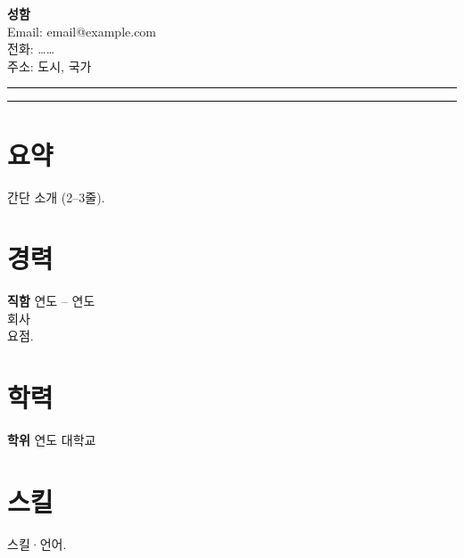 \documentclass[11pt,a4paper]{article}
\begin{document}
\begin{minipage}[t]{0.72\textwidth}
\vspace{0pt}
{\LARGE \textbf{성함}}\\[0.25em]
Email: email@example.com \\
전화: …… \\
주소: 도시, 국가
\end{minipage}
\begin{minipage}[t]{0.25\textwidth}
\vspace{0pt}
\raggedleft
\rule{2.8cm}{3.2cm}
\end{minipage}
\vspace{0.5em}
\noindent\rule{\textwidth}{0.4pt}
\section*{요약}
간단 소개 (2--3줄).
\section*{경력}
\textbf{직함} \hfill 연도 -- 연도 \\
회사 \\
요점.
\section*{학력}
\textbf{학위} \hfill 연도 \quad 대학교
\section*{스킬}
스킬·언어.
\end{document}
